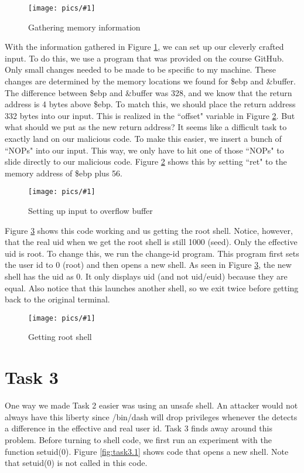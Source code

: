 \documentclass[11pt]{article}
\newcommand{\fig}[2]{ 
\begin{figure}[h]
	\centering
	\caption{#2}
	\texttt{[image: pics/\#1]}
	\label{fig:#1}
\end{figure} 
}
\begin{document}
\fig{task2.2}{Gathering memory information}

With the information gathered in Figure \ref{fig:task2.2}, we can set up our cleverly crafted input. To do this, we use a program that was provided on the course GitHub. Only small changes needed to be made to be specific to my machine. These changes are determined by the memory locations we found for \$ebp and \&buffer. The difference between \$ebp and \&buffer was 328, and we know that the return address is 4 bytes above \$ebp. To match this, we should place the return address 332 bytes into our input. This is realized in the ``offset" variable in Figure \ref{fig:task2.3}. But what should we put as the new return address? It seems like a difficult task to exactly land on our malicious code. To make this easier, we insert a bunch of ``NOPs" into our input. This way, we only have to hit one of those ``NOPs" to slide directly to our malicious code. Figure \ref{fig:task2.3} shows this by setting ``ret" to the memory address of \$ebp plus 56.

\fig{task2.3}{Setting up input to overflow buffer}

Figure \ref{fig:task2.4} shows this code working and us getting the root shell. Notice, however, that the real uid when we get the root shell is still 1000 (seed). Only the effective uid is root. To change this, we run the change-id program. This program first sets the user id to 0 (root) and then opens a new shell. As seen in Figure \ref{fig:task2.4}, the new shell has the uid as 0. It only displays uid (and not uid/euid) because they are equal. Also notice that this launches another shell, so we exit twice before getting back to the original terminal.

\fig{task2.4}{Getting root shell}

\newpage

\section*{Task 3}

One way we made Task 2 easier was using an unsafe shell. An attacker would not always have this liberty since /bin/dash will drop privileges whenever the detects a difference in the effective and real user id. Task 3 finds away around this problem. Before turning to shell code, we first run an experiment with the function setuid(0). Figure \ref{fig:task3.1} shows code that opens a new shell. Note that setuid(0) is not called in this code.
\end{document}
